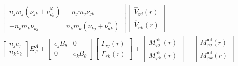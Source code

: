 \begin{multline}  \label{eqn:ConservationMomentumToroidal}
	\begin{bmatrix}
		n_j m_j \left( \nu_{jk} + \nu^{\varphi}_{dj} \right) & -n_j m_j \nu_{jk} \\
		-n_k m_k \nu_{kj}  & n_k m_k \left( \nu_{kj}+\nu^{\varphi}_{dk} \right)
	\end{bmatrix}
	\begin{bmatrix}
		\hat{V}_{\varphi j}\left(r\right) \\
		\hat{V}_{\varphi k}\left(r\right)								
	\end{bmatrix} = \\
	\begin{bmatrix}
		n_j e_j \\
		n_k e_k
	\end{bmatrix} E^A_{\varphi} +
	\begin{bmatrix}
		e_j B_\theta & 0 \\
		0            & e_k B_\theta
	\end{bmatrix}
	\begin{bmatrix}
		\Gamma_{rj} \left(r\right) \\
		\Gamma_{rk} \left(r\right)
	\end{bmatrix} +
	\begin{bmatrix}
		M_{\varphi j}^\mathrm{nbi}\left(r\right) \\
		M_{\varphi k}^\mathrm{nbi}\left(r\right)
	\end{bmatrix} -
	\begin{bmatrix}
		M_{\varphi j}^\mathrm{iol}\left(r\right) \\
		M_{\varphi k}^\mathrm{iol}\left(r\right)
	\end{bmatrix}
\end{multline}